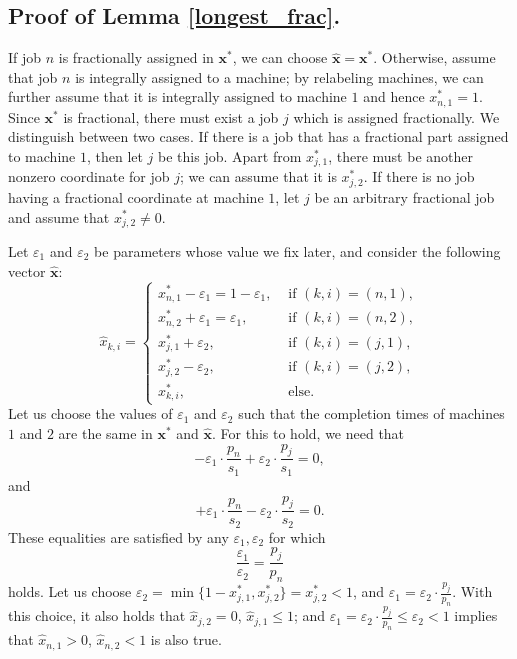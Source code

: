 \documentclass[moor,sglanonrev]{informs4}
\theoremstyle{plain}
\begin{document}
\begin{APPENDICES}
\subsection{Proof of Lemma \ref{longest_frac}.}
    If job $n$ is fractionally assigned in $\bm{x}^*$, we can choose $\hat{\bm{x}} = \bm{x}^*$. Otherwise, assume that job $n$ is integrally assigned to a machine; by relabeling machines, we can further assume that it is integrally assigned to machine $1$ and hence $x^*_{n,1} = 1$. Since $\bm{x^*}$ is fractional, there must exist a job $j$ which is assigned fractionally. We distinguish between two cases. If there is a job that has a fractional part assigned to machine $1$, then let $j$ be this job. Apart from $x^*_{j,1}$, there must be another nonzero coordinate for job $j$; we can assume that it is $x^*_{j,2}$. If there is no job having a fractional coordinate at machine $1$, let $j$ be an arbitrary fractional job and assume that $x^*_{j,2} \ne 0$.

    Let $\varepsilon_1$ and $\varepsilon_2$ be parameters whose value we fix later, and consider the following vector $\bm{\hat{x}}$:
    \[
    \hat{x}_{k,i} = \begin{cases}
        x^*_{n,1} - \varepsilon_1 = 1-\varepsilon_1, & \text{ if } (k,i) = (n,1), \\
        x^*_{n,2} + \varepsilon_1 = \varepsilon_1, & \text{ if } (k,i) = (n,2), \\
        x^*_{j,1} + \varepsilon_2, & \text{ if } (k,i) = (j,1), \\
        x^*_{j,2} - \varepsilon_2, & \text{ if } (k,i) = (j,2), \\
        x^*_{k,i}, & \text{ else}.
    \end{cases}
    \]
    Let us choose the values of $\varepsilon_1$ and $\varepsilon_2$ such that the completion times of machines $1$ and $2$ are the same in $\bm{x}^*$ and $\bm{\hat{x}}$. For this to hold, we need that
    \[
    -\varepsilon_1 \cdot \frac{p_n}{s_1} + \varepsilon_2 \cdot \frac{p_j}{s_1} = 0,
    \]
    and 
    \[
    +\varepsilon_1 \cdot \frac{p_n}{s_2} - \varepsilon_2 \cdot \frac{p_j}{s_2} = 0.
    \]
    These equalities are satisfied by any $\varepsilon_1, \varepsilon_2$ for which 
    \[
    \frac{\varepsilon_1}{\varepsilon_2} = \frac{p_j}{p_n}
    \]
    holds. Let us choose $\varepsilon_2 = \min\{1-x^*_{j,1}, x^*_{j,2}\} = x^*_{j,2} < 1$, and $\varepsilon_1 = \varepsilon_2 \cdot\frac{p_j}{p_n}$. With this choice, it also holds that $\hat{x}_{j,2} = 0$, $\hat{x}_{j,1} \le 1$; and $\varepsilon_1 = \varepsilon_2 \cdot \frac{p_j}{p_n} \le \varepsilon_2 < 1$ implies that $\hat{x}_{n,1} > 0$, $\hat{x}_{n,2} < 1$ is also true.


\end{APPENDICES}
\end{document}
